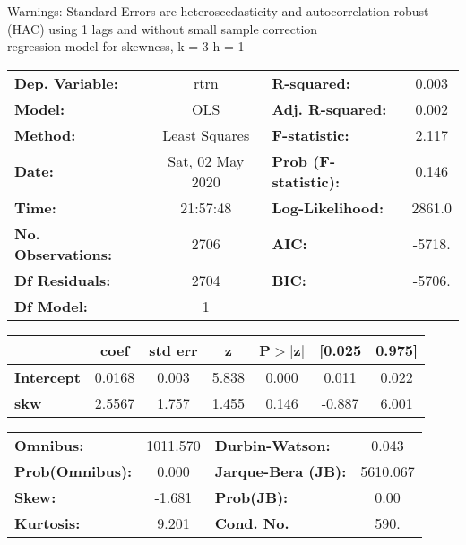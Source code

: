Warnings: \newline
 [1] Standard Errors are heteroscedasticity and autocorrelation robust (HAC) using 1 lags and without small sample correction\\ 

regression model for skewness, k = 3 h = 1\begin{center}
\begin{tabular}{lclc}
\toprule
\textbf{Dep. Variable:}    &       rtrn       & \textbf{  R-squared:         } &     0.003   \\
\textbf{Model:}            &       OLS        & \textbf{  Adj. R-squared:    } &     0.002   \\
\textbf{Method:}           &  Least Squares   & \textbf{  F-statistic:       } &     2.117   \\
\textbf{Date:}             & Sat, 02 May 2020 & \textbf{  Prob (F-statistic):} &    0.146    \\
\textbf{Time:}             &     21:57:48     & \textbf{  Log-Likelihood:    } &    2861.0   \\
\textbf{No. Observations:} &        2706      & \textbf{  AIC:               } &    -5718.   \\
\textbf{Df Residuals:}     &        2704      & \textbf{  BIC:               } &    -5706.   \\
\textbf{Df Model:}         &           1      & \textbf{                     } &             \\
\bottomrule
\end{tabular}
\begin{tabular}{lcccccc}
                   & \textbf{coef} & \textbf{std err} & \textbf{z} & \textbf{P$> |$z$|$} & \textbf{[0.025} & \textbf{0.975]}  \\
\midrule
\textbf{Intercept} &       0.0168  &        0.003     &     5.838  &         0.000        &        0.011    &        0.022     \\
\textbf{skw}       &       2.5567  &        1.757     &     1.455  &         0.146        &       -0.887    &        6.001     \\
\bottomrule
\end{tabular}
\begin{tabular}{lclc}
\textbf{Omnibus:}       & 1011.570 & \textbf{  Durbin-Watson:     } &    0.043  \\
\textbf{Prob(Omnibus):} &   0.000  & \textbf{  Jarque-Bera (JB):  } & 5610.067  \\
\textbf{Skew:}          &  -1.681  & \textbf{  Prob(JB):          } &     0.00  \\
\textbf{Kurtosis:}      &   9.201  & \textbf{  Cond. No.          } &     590.  \\
\bottomrule
\end{tabular}
\end{center}

